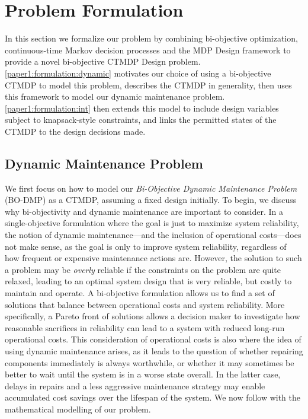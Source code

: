 \documentclass[11pt,authoryear,a4paper]{article}
\theoremstyle{definition}
\begin{document}
\section{Problem Formulation}
\label{paper1:formulation}
In this section we formalize our problem by combining bi-objective optimization, continuous-time Markov decision processes and the MDP Design framework to provide a novel bi-objective CTMDP Design problem. {\autoref{paper1:formulation:dynamic} motivates our choice of using a bi-objective CTMDP to model this problem, describes the CTMDP in generality, then uses this framework to model our dynamic maintenance problem.} \autoref{paper1:formulation:int} then extends this model to include design variables subject to knapsack-style constraints, and links the permitted states of the CTMDP to the design decisions made.

\subsection{Dynamic Maintenance Problem}
\label{paper1:formulation:dynamic}

We first focus on how to model our \emph{Bi-Objective Dynamic Maintenance Problem} (BO-DMP) as a CTMDP, assuming a fixed design initially. {To begin, we discuss why bi-objectivity and dynamic maintenance are important to consider. In a single-objective formulation where the goal is just to maximize system reliability, the notion of dynamic maintenance---and the inclusion of operational costs---does not make sense, as the goal is only to improve system reliability, regardless of how frequent or expensive maintenance actions are. However, the solution to such a problem may be \emph{overly} reliable if the constraints on the problem are quite relaxed, leading to an optimal system design that is very reliable, but costly to maintain and operate. A bi-objective formulation allows us to find a set of solutions that balance between operational costs and system reliability. More specifically, a Pareto front of solutions allows a decision maker to investigate how reasonable sacrifices in reliability can lead to a system with reduced long-run operational costs. This consideration of operational costs is also where the idea of using dynamic maintenance arises, as it leads to the question of whether repairing components immediately is always worthwhile, or whether it may sometimes be better to wait until the system is in a worse state overall. In the latter case, delays in repairs and a less aggressive maintenance strategy may enable accumulated cost savings over the lifespan of the system. We now follow with the mathematical modelling of our problem.}  
\end{document}
